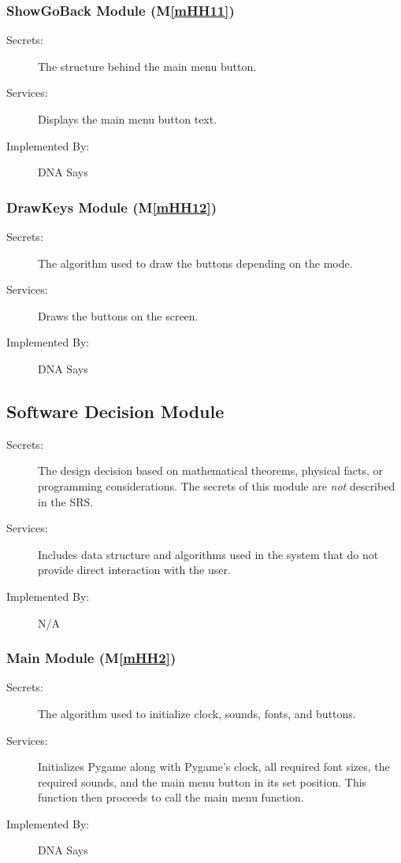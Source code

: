 \documentclass[12pt, titlepage]{article}
\newcommand{\mref}[1]{M\ref{#1}}
\begin{document}
\subsubsection{ShowGoBack Module (\mref{mHH11})}
\begin{description}
\item[Secrets:]The structure behind the main menu button.
\item[Services:]Displays the main menu button text.
\item[Implemented By:] DNA Says
\end{description}

\subsubsection{DrawKeys Module (\mref{mHH12})}
\begin{description}
\item[Secrets:]The algorithm used to draw the buttons depending on the mode.
\item[Services:]Draws the buttons on the screen.
\item[Implemented By:] DNA Says
\end{description}


\subsection{Software Decision Module}
\begin{description}
\item[Secrets:] The design decision based on mathematical theorems, physical
  facts, or programming considerations. The secrets of this module are
  \emph{not} described in the SRS.
\item[Services:] Includes data structure and algorithms used in the system that
  do not provide direct interaction with the user. 
\item[Implemented By:] N/A
\end{description}

\subsubsection{Main Module (\mref{mHH2})}
\begin{description}
\item[Secrets:]The algorithm used to initialize clock, sounds, fonts, and buttons.
\item[Services:]Initializes Pygame along with Pygame's clock, all required font sizes, the required sounds, and the main menu button in its set position. This function then proceeds to call the main menu function.
\item[Implemented By:] DNA Says
\end{description}
\end{document}
